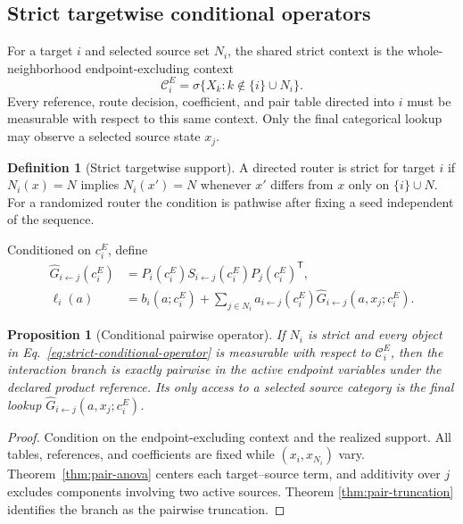 \documentclass[10pt]{article}
\newtheorem{proposition}[theorem]{Proposition}
\theoremstyle{definition}
\newtheorem{definition}[theorem]{Definition}
\theoremstyle{remark}
\newcommand{\BookSection}[1]{\subsection{#1}}
\begin{document}
\BookSection{Strict targetwise conditional operators}

For a target $i$ and selected source set $N_i$, the shared strict context is the
whole-neighborhood endpoint-excluding context
\begin{equation}
\mathcal C_i^E
=\sigma\{X_k:k\notin\{i\}\cup N_i\}.
\label{eq:whole-neighborhood-cavity}
\end{equation}
Every reference, route decision, coefficient, and pair table directed into $i$ must be measurable
with respect to this same context.  Only the final categorical lookup may observe a selected source
state $x_j$.

\begin{definition}[Strict targetwise support]
A directed router is strict for target $i$ if $N_i(x)=N$ implies $N_i(x')=N$ whenever $x'$ differs
from $x$ only on $\{i\}\cup N$.  For a randomized router the condition is pathwise after fixing a
seed independent of the sequence.
\end{definition}

Conditioned on $c_i^E$, define
\begin{align}
\widehat G_{i\leftarrow j}(c_i^E)
&=P_i(c_i^E)S_{i\leftarrow j}(c_i^E)P_j(c_i^E)^{\mathsf T},\\
\ell_i(a)
&=b_i(a;c_i^E)
+\sum_{j\in N_i}a_{i\leftarrow j}(c_i^E)
\widehat G_{i\leftarrow j}(a,x_j;c_i^E).
\label{eq:strict-conditional-operator}
\end{align}

\begin{proposition}[Conditional pairwise operator]
\label{prop:strict-operator}
If $N_i$ is strict and every object in Eq.~\ref{eq:strict-conditional-operator} is measurable with
respect to $\mathcal C_i^E$, then the interaction branch is exactly pairwise in the active endpoint
variables under the declared product reference.  Its only access to a selected source category is
the final lookup $\widehat G_{i\leftarrow j}(a,x_j;c_i^E)$.
\end{proposition}

\begin{proof}
Condition on the endpoint-excluding context and the realized support.  All tables, references, and coefficients are
fixed while $(x_i,x_{N_i})$ vary.  Theorem~\ref{thm:pair-anova} centers each target--source term,
and additivity over $j$ excludes components involving two active sources.  Theorem
\ref{thm:pair-truncation} identifies the branch as the pairwise truncation.
\end{proof}
\end{document}
